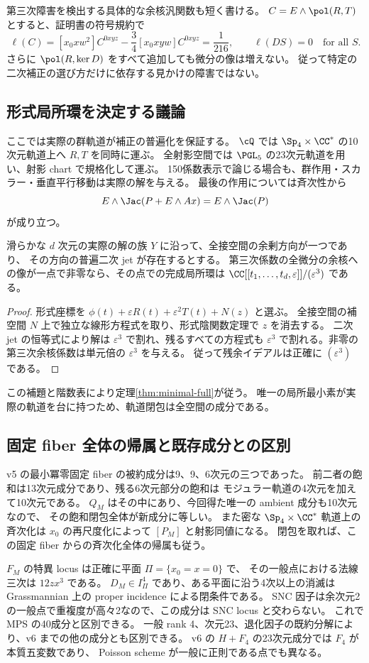 第三次障害を検出する具体的な余核汎関数も短く書ける。
$C=E\wedge\pol(R,T)$ とすると、証明書の符号規約で
\[
 \ell(C)=[x_0xw^2]C^{0xyz}-\frac34[x_0xyw]C^{0xyz}
          =\frac1{216},\qquad \ell(D S)=0\quad\text{for all }S.
\]
さらに $\pol(R,\ker D)$ をすべて追加しても微分の像は増えない。
従って特定の二次補正の選び方だけに依存する見かけの障害ではない。

\subsection{形式局所環を決定する議論}
ここでは実際の群軌道が補正の普遍化を保証する。
$\cQ$ では $\Sp_4\times\CC^*$ の10次元軌道上へ $R,T$ を同時に運ぶ。
全射影空間では $\PGL_5$ の23次元軌道を用い、射影 chart で規格化して運ぶ。
150係数表示で論じる場合も、群作用・スカラー・垂直平行移動は実際の解を与える。
最後の作用については斉次性から
\[
 E\wedge\Jac(P+E\wedge Ax)=E\wedge\Jac(P)
\]
が成り立つ。

\begin{lemma}\label{lem:universal-two-jet-v7}
滑らかな $d$ 次元の実際の解の族 $Y$ に沿って、全接空間の余剰方向が一つであり、
その方向の普遍二次 jet が存在するとする。
第三次係数の全微分の余核への像が一点で非零なら、その点での完成局所環は
$\CC[[t_1,\ldots,t_d,\varepsilon]]/(\varepsilon^3)$ である。
\end{lemma}
\begin{proof}
形式座標を $\phi(t)+\varepsilon R(t)+\varepsilon^2T(t)+N(z)$ と選ぶ。
全接空間の補空間 $N$ 上で独立な線形方程式を取り、形式陰関数定理で $z$ を消去する。
二次 jet の恒等式により解は $\varepsilon^3$ で割れ、残るすべての方程式も
$\varepsilon^3$ で割れる。非零の第三次余核係数は単元倍の $\varepsilon^3$ を与える。
従って残余イデアルは正確に $(\varepsilon^3)$ である。
\end{proof}
この補題と階数表により定理\ref{thm:minimal-full}が従う。
唯一の局所最小素が実際の軌道を台に持つため、軌道閉包は全空間の成分である。

\subsection{固定 fiber 全体の帰属と既存成分との区別}
v5 の最小冪零固定 fiber の被約成分は9、9、6次元の三つであった。
前二者の飽和は13次元成分であり、残る6次元部分の飽和は
モジュラー軌道の4次元を加えて10次元である。
$Q_M$ はその中にあり、今回得た唯一の ambient 成分も10次元なので、
その飽和閉包全体が新成分に等しい。
また密な $\Sp_4\times\CC^*$ 軌道上の斉次化は $x_0$ の再尺度化によって $[P_M]$ と射影同値になる。
閉包を取れば、この固定 fiber からの斉次化全体の帰属も従う。

$F_M$ の特異 locus は正確に平面 $\Pi=\{x_0=x=0\}$ で、
その一般点における法線三次は $12zx^3$ である。
$D_M\in I_\Pi^4$ であり、ある平面に沿う4次以上の消滅は Grassmannian 上の
proper incidence による閉条件である。
SNC 因子は余次元2の一般点で重複度が高々2なので、この成分は SNC locus と交わらない。
これで MPS の40成分と区別できる。
一般 rank 4、次元23、退化因子の既約分解により、v6 までの他の成分とも区別できる。
v6 の $H+F_4$ の23次元成分では $F_4$ が本質五変数であり、
Poisson scheme が一般に正則である点でも異なる。
